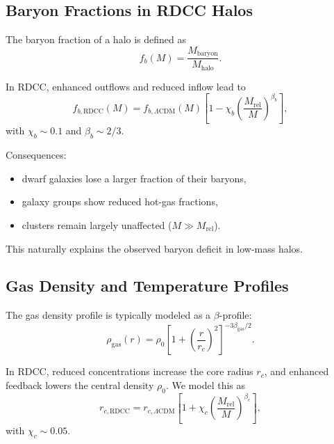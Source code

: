 \documentclass[11pt,a4paper]{article}
\begin{document}
\subsection{Baryon Fractions in RDCC Halos}

The baryon fraction of a halo is defined as
\begin{equation}
f_{b}(M)
=
\frac{M_{\mathrm{baryon}}}{M_{\mathrm{halo}}}.
\end{equation}

In RDCC, enhanced outflows and reduced inflow lead to
\begin{equation}
f_{b,\mathrm{RDCC}}(M)
=
f_{b,\Lambda\mathrm{CDM}}(M)
\left[
1
-
\chi_{b}
\left(
\frac{M_{\mathrm{rel}}}{M}
\right)^{\beta_{b}}
\right],
\end{equation}
with $\chi_{b} \sim 0.1$ and $\beta_{b} \sim 2/3$.

Consequences:
\begin{itemize}
\item dwarf galaxies lose a larger fraction of their baryons,
\item galaxy groups show reduced hot-gas fractions,
\item clusters remain largely unaffected ($M \gg M_{\mathrm{rel}}$).
\end{itemize}

This naturally explains the observed baryon deficit in low-mass halos.

\subsection{Gas Density and Temperature Profiles}

The gas density profile is typically modeled as a $\beta$-profile:
\begin{equation}
\rho_{\mathrm{gas}}(r)
=
\rho_{0}
\left[
1
+
\left(
\frac{r}{r_{c}}
\right)^{2}
\right]^{-3\beta_{\mathrm{gas}}/2}.
\end{equation}

In RDCC, reduced concentrations increase the core radius $r_{c}$, and enhanced feedback
lowers the central density $\rho_{0}$. We model this as
\begin{equation}
r_{c,\mathrm{RDCC}}
=
r_{c,\Lambda\mathrm{CDM}}
\left[
1
+
\chi_{c}
\left(
\frac{M_{\mathrm{rel}}}{M}
\right)^{\beta_{c}}
\right],
\end{equation}
with $\chi_{c} \sim 0.05$.
\end{document}
